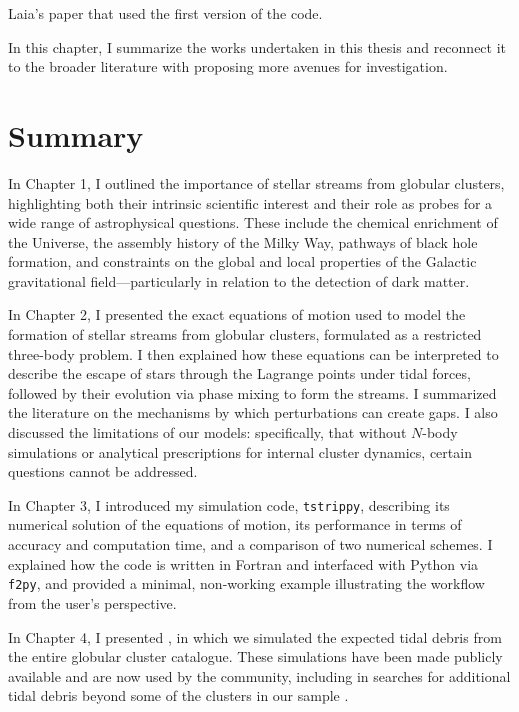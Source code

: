\citet{2022A&A...664A..31C} Laia's paper that used the first version of the code.


In this chapter, I summarize the works undertaken in this thesis and reconnect it to the broader literature with proposing more avenues for investigation. 

\section{Summary}
    In Chapter 1, I outlined the importance of stellar streams from globular clusters, highlighting both their intrinsic scientific interest and their role as probes for a wide range of astrophysical questions. These include the chemical enrichment of the Universe, the assembly history of the Milky Way, pathways of black hole formation, and constraints on the global and local properties of the Galactic gravitational field—particularly in relation to the detection of dark matter.

    In Chapter 2, I presented the exact equations of motion used to model the formation of stellar streams from globular clusters, formulated as a restricted three-body problem. I then explained how these equations can be interpreted to describe the escape of stars through the Lagrange points under tidal forces, followed by their evolution via phase mixing to form the streams. I summarized the literature on the mechanisms by which perturbations can create gaps. I also discussed the limitations of our models: specifically, that without $N$-body simulations or analytical prescriptions for internal cluster dynamics, certain questions cannot be addressed.

    In Chapter 3, I introduced my simulation code, \texttt{tstrippy}, describing its numerical solution of the equations of motion, its performance in terms of accuracy and computation time, and a comparison of two numerical schemes. I explained how the code is written in Fortran and interfaced with Python via \texttt{f2py}, and provided a minimal, {\tiny non}-working example illustrating the workflow from the user's perspective.

    In Chapter 4, I presented \citet{2023A&A...673A..44F}, in which we simulated the expected tidal debris from the entire globular cluster catalogue. These simulations have been made publicly available and are now used by the community, including in searches for additional tidal debris beyond some of the clusters in our sample \citep{2025arXiv250705590K,2025ApJ...988...39W}.
    
